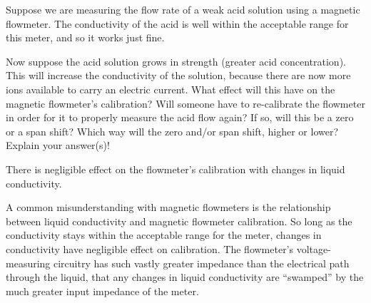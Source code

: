 

Suppose we are measuring the flow rate of a weak acid solution using a magnetic flowmeter.  The conductivity of the acid is well within the acceptable range for this meter, and so it works just fine.

Now suppose the acid solution grows in strength (greater acid concentration).  This will increase the conductivity of the solution, because there are now more ions available to carry an electric current.  What effect will this have on the magnetic flowmeter's calibration?  Will someone have to re-calibrate the flowmeter in order for it to properly measure the acid flow again?  If so, will this be a zero or a span shift?  Which way will the zero and/or span shift, higher or lower?  Explain your answer(s)!







There is negligible effect on the flowmeter's calibration with changes in liquid conductivity.

\vskip 10pt

A common misunderstanding with magnetic flowmeters is the relationship between liquid conductivity and magnetic flowmeter calibration.  So long as the conductivity stays within the acceptable range for the meter, changes in conductivity have negligible effect on calibration.  The flowmeter's voltage-measuring circuitry has such vastly greater impedance than the electrical path through the liquid, that any changes in liquid conductivity are ``swamped'' by the much greater input impedance of the meter.












